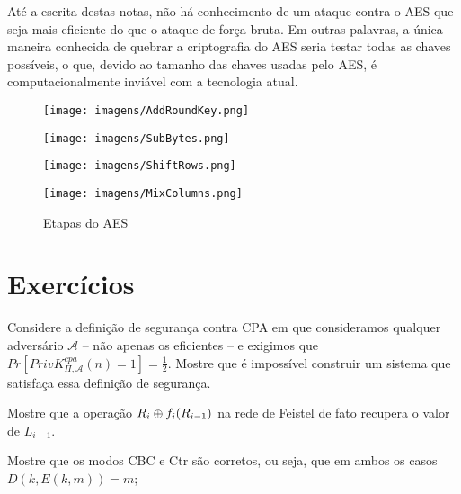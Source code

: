 Até a escrita destas notas, não há conhecimento de um ataque contra o AES que seja mais eficiente do que o ataque de força bruta.
Em outras palavras, a única maneira conhecida de quebrar a criptografia do AES seria testar todas as chaves possíveis, o que, devido ao tamanho das chaves usadas pelo AES, é computacionalmente inviável com a tecnologia atual.


\begin{figure}[!htp]
  \centering
  \begin{minipage}{.45\textwidth}
    \centering
    \texttt{[image: imagens/AddRoundKey.png]}  
  \end{minipage}
 \begin{minipage}{.45\textwidth}
    \centering
    \texttt{[image: imagens/SubBytes.png]}
  \end{minipage}
  \begin{minipage}{.45\textwidth}
    \centering
    \texttt{[image: imagens/ShiftRows.png]}  
  \end{minipage}
 \begin{minipage}{.45\textwidth}
    \centering
    \texttt{[image: imagens/MixColumns.png]}
  \end{minipage}
  \caption{Etapas do AES}
  \label{fig:aes}
\end{figure}



\section{Exercícios}
\label{sec:exercicios}

\begin{exercicio}
  Considere a definição de segurança contra CPA em que consideramos qualquer adversário $\mathcal{A}$ -- não apenas os eficientes -- e exigimos que $Pr[PrivK^{cpa}_{\Pi,\mathcal{A}}(n) = 1] = \frac{1}{2}$.
  Mostre que é impossível construir um sistema que satisfaça essa definição de segurança.
\end{exercicio}

\begin{exercicio}
Mostre que a operação $R_i \oplus f_i(R_{i-1})$ na rede de Feistel de fato recupera o valor de $L_{i-1}$.
\end{exercicio}

\begin{exercicio}
  Mostre que os modos CBC e Ctr são corretos, ou seja, que em ambos os casos $D(k, E(k,m)) = m$;
\end{exercicio}

